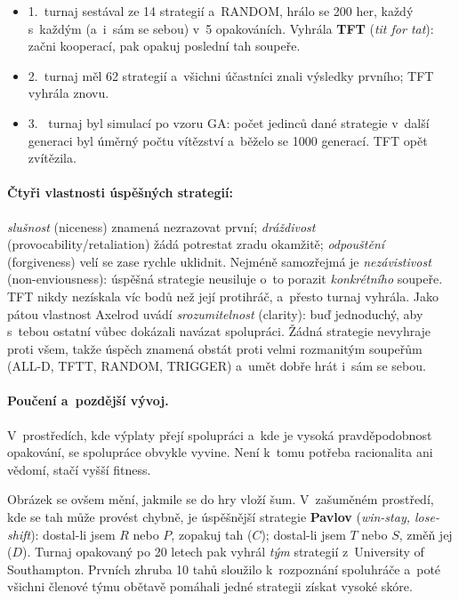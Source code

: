 \documentclass[11pt,a4paper]{article}
\theoremstyle{definition}
\begin{document}
\begin{itemize}
\item 1.\ turnaj sestával ze 14 strategií a~RANDOM, hrálo se 200 her, každý s~každým
  (a~i~sám se sebou) v~5 opakováních. Vyhrála \textbf{TFT} (\emph{tit for tat}): začni
  kooperací, pak opakuj poslední tah soupeře.
\item 2.\ turnaj měl 62 strategií a~všichni účastníci znali výsledky prvního; TFT
  vyhrála znovu.
\item 3.\  turnaj byl simulací po vzoru GA: počet jedinců dané strategie
  v~další generaci byl úměrný počtu vítězství a~běželo se 1000 generací. TFT opět zvítězila.
\end{itemize}

\paragraph{Čtyři vlastnosti úspěšných strategií:}
\emph{slušnost} (niceness) znamená nezrazovat první;
\emph{dráždivost} (provocability/retaliation) žádá potrestat zradu okamžitě;
\emph{odpouštění} (forgiveness) velí se zase rychle uklidnit.
Nejméně samozřejmá je \emph{nezávistivost} (non-enviousness): úspěšná strategie neusiluje
o~to porazit \emph{konkrétního} soupeře. TFT nikdy nezískala víc bodů než její protihráč,
a~přesto turnaj vyhrála.
Jako pátou vlastnost Axelrod uvádí \emph{srozumitelnost} (clarity): buď jednoduchý, aby
s~tebou ostatní vůbec dokázali navázat spolupráci.
Žádná strategie nevyhraje proti všem, takže úspěch znamená obstát proti velmi rozmanitým
soupeřům (ALL-D, TFTT, RANDOM, TRIGGER) a~umět dobře hrát i~sám se sebou.

\paragraph{Poučení a~pozdější vývoj.} V~prostředích, kde výplaty přejí spolupráci a~kde je
vysoká pravděpodobnost opakování, se spolupráce obvykle vyvine. Není k~tomu potřeba
racionalita ani vědomí, stačí vyšší fitness.

Obrázek se ovšem mění, jakmile se do hry vloží šum. V~zašuměném prostředí, kde se tah může
provést chybně, je úspěšnější strategie \textbf{Pavlov} (\emph{win-stay, lose-shift}):
dostal-li jsem $R$ nebo $P$, zopakuj tah ($C$); dostal-li jsem $T$ nebo $S$, změň jej ($D$).
Turnaj opakovaný po 20 letech pak vyhrál \emph{tým} strategií z~University of Southampton.
Prvních zhruba 10 tahů sloužilo k~rozpoznání spoluhráče a~poté všichni členové týmu obětavě
pomáhali jedné  strategii získat vysoké skóre.
\end{document}
